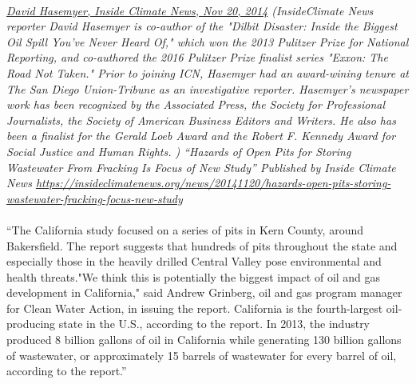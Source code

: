 \documentclass{article}
\begin{document}
\paragraph{}
\small
\textit{
\underline{David Hasemyer, Inside Climate News, Nov 20, 2014}
  (InsideClimate News reporter David Hasemyer is co-author of the "Dilbit Disaster: Inside the Biggest Oil Spill You've Never Heard Of," which won the 2013 Pulitzer Prize for National Reporting, and co-authored the 2016 Pulitzer Prize finalist series "Exxon: The Road Not Taken." Prior to joining ICN, Hasemyer had an award-wining tenure at The San Diego Union-Tribune as an investigative reporter. Hasemyer's newspaper work has been recognized by the Associated Press, the Society for Professional Journalists, the Society of American Business Editors and Writers. He also has been a finalist for the Gerald Loeb Award and the Robert F. Kennedy Award for Social Justice and Human Rights. ) “Hazards of Open Pits for Storing Wastewater From Fracking Is Focus of New Study” Published by Inside Climate News
\url{https://insideclimatenews.org/news/20141120/hazards-open-pits-storing-wastewater-fracking-focus-new-study }}
\normalsize
\paragraph{}
``The California study focused on a series of pits in Kern County, around Bakersfield. The report suggests that hundreds of pits throughout the state and especially those in the heavily drilled Central Valley pose environmental and health threats."We think this is potentially the biggest impact of oil and gas development in California," said Andrew Grinberg, oil and gas program manager for Clean Water Action, in issuing the report. California is the fourth-largest oil-producing state in the U.S., according to the report.  In 2013, the industry produced 8 billion gallons of oil in California while generating 130 billion gallons of wastewater, or approximately 15 barrels of wastewater for every barrel of oil, according to the report.''
\end{document}
